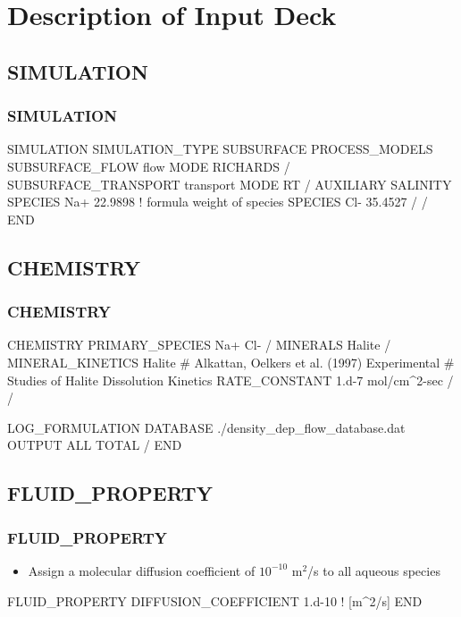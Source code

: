 \documentclass{beamer}
\newcommand\bluecomment[1]{{{\color{blue} #1}}}
\newcommand\magentacomment[1]{{{\color{magenta} #1}}}
\begin{document}
\section{Description of Input Deck}

\subsection{SIMULATION}
\begin{frame}\frametitle{SIMULATION}

\begin{semiverbatim}
SIMULATION
  SIMULATION_TYPE SUBSURFACE
  PROCESS_MODELS
    SUBSURFACE_FLOW flow
      MODE RICHARDS
    /
    SUBSURFACE_TRANSPORT transport
      MODE RT
    /
    \magentacomment{AUXILIARY SALINITY
      SPECIES Na+ 22.9898    \bluecomment{! formula weight of species}
      SPECIES Cl- 35.4527
    /}
  /
END
\end{semiverbatim}

\end{frame}

\subsection{CHEMISTRY}

\begin{frame}\frametitle{CHEMISTRY}
\begin{semiverbatim}
CHEMISTRY
  PRIMARY_SPECIES
    Na+
    Cl-
  /
  MINERALS
    Halite
  /
  MINERAL_KINETICS
    Halite
      \bluecomment{# Alkattan, Oelkers et al. (1997) Experimental
      #  Studies of Halite Dissolution Kinetics}
      RATE_CONSTANT 1.d-7 mol/cm^2-sec 
    /
  /
  
  LOG_FORMULATION
  DATABASE ./density_dep_flow_database.dat
  OUTPUT
    ALL
    TOTAL
  /
END
\end{semiverbatim}

\end{frame}

\subsection{FLUID\_PROPERTY}

\begin{frame}\frametitle{FLUID\_PROPERTY}

\begin{itemize}
  \item Assign a molecular diffusion coefficient of $10^{-10}$ m$^2$/s to all aqueous species
\end{itemize}

\begin{semiverbatim}
  
FLUID_PROPERTY
  DIFFUSION_COEFFICIENT 1.d-10   \bluecomment{! [m^2/s]}
END
\end{semiverbatim}

\end{frame}
\end{document}
